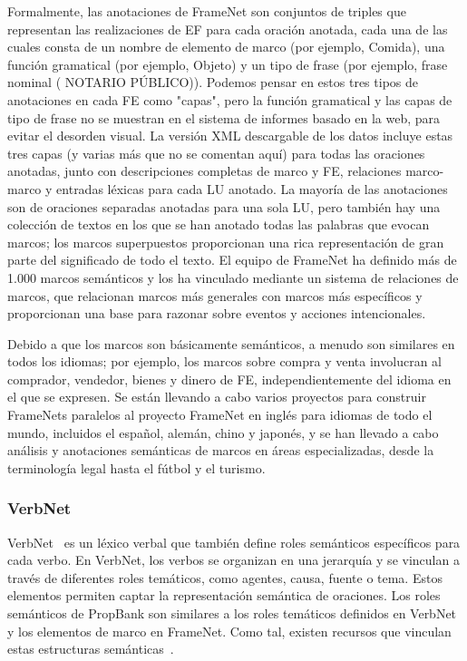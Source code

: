 Formalmente, las anotaciones de FrameNet son conjuntos de triples que representan las realizaciones de EF para cada oración anotada, cada una de las cuales consta de un nombre de elemento de marco (por ejemplo, Comida), una función gramatical (por ejemplo, Objeto) y un tipo de frase (por ejemplo, frase nominal ( NOTARIO PÚBLICO)). Podemos pensar en estos tres tipos de anotaciones en cada FE como "capas", pero la función gramatical y las capas de tipo de frase no se muestran en el sistema de informes basado en la web, para evitar el desorden visual. La versión XML descargable de los datos incluye estas tres capas (y varias más que no se comentan aquí) para todas las oraciones anotadas, junto con descripciones completas de marco y FE, relaciones marco-marco y entradas léxicas para cada LU anotado. La mayoría de las anotaciones son de oraciones separadas anotadas para una sola LU, pero también hay una colección de textos en los que se han anotado todas las palabras que evocan marcos; los marcos superpuestos proporcionan una rica representación de gran parte del significado de todo el texto. El equipo de FrameNet ha definido más de 1.000 marcos semánticos y los ha vinculado mediante un sistema de relaciones de marcos, que relacionan marcos más generales con marcos más específicos y proporcionan una base para razonar sobre eventos y acciones intencionales.

Debido a que los marcos son básicamente semánticos, a menudo son similares en todos los idiomas; por ejemplo, los marcos sobre compra y venta involucran al comprador, vendedor, bienes y dinero de FE, independientemente del idioma en el que se expresen. Se están llevando a cabo varios proyectos para construir FrameNets paralelos al proyecto FrameNet en inglés para idiomas de todo el mundo, incluidos el español, alemán, chino y japonés, y se han llevado a cabo análisis y anotaciones semánticas de marcos en áreas especializadas, desde la terminología legal hasta el fútbol y el turismo.

\subsubsection*{VerbNet}

VerbNet~\cite{verbnet} es un léxico verbal que también define roles semánticos específicos para cada verbo. En VerbNet, los verbos se organizan en una jerarquía y se vinculan a través de diferentes roles temáticos, como agentes, causa, fuente o tema. Estos elementos permiten captar la representación semántica de oraciones.
Los roles semánticos de PropBank son similares a los roles temáticos definidos en VerbNet y los elementos de marco en FrameNet. Como tal, existen recursos que vinculan estas estructuras semánticas~\cite{semlink}.

